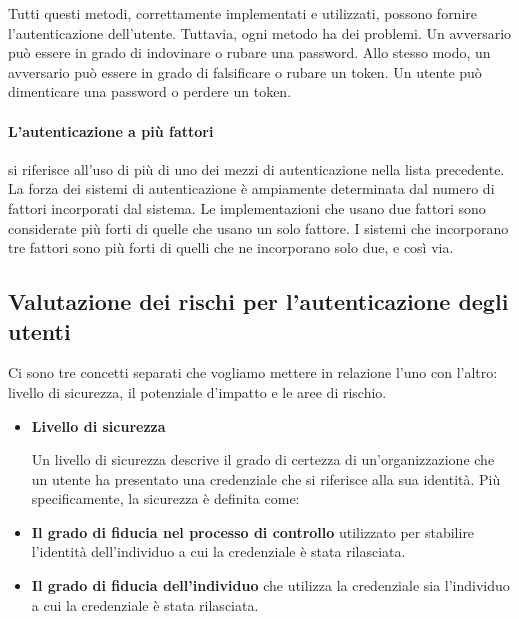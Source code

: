 Tutti questi metodi, correttamente implementati e utilizzati, possono fornire l'autenticazione dell'utente. Tuttavia, ogni metodo ha dei problemi. Un avversario può essere in grado di indovinare o rubare una password. Allo stesso modo, un avversario può essere in grado di falsificare o rubare un token. Un utente può dimenticare una password o perdere un token. 
\\
\paragraph{L'autenticazione a più fattori} si riferisce all'uso di più di uno dei mezzi di autenticazione nella lista precedente. La forza dei sistemi di autenticazione è ampiamente determinata dal numero di fattori incorporati dal sistema. Le implementazioni che usano due fattori sono considerate più forti di quelle che usano un solo fattore. I sistemi che incorporano tre fattori sono più forti di quelli che ne incorporano solo due, e così via.

\newpage
\subsection{Valutazione dei rischi per l'autenticazione degli utenti}
Ci sono tre concetti separati che vogliamo mettere in relazione l'uno con l'altro: livello di sicurezza, il potenziale d'impatto e le aree di rischio.

\begin{itemize}
    \item \textbf{Livello di sicurezza}

Un livello di sicurezza descrive il grado di certezza di un'organizzazione che un utente ha presentato una credenziale che si riferisce alla sua identità. Più specificamente, la sicurezza è definita come:

    \item \textbf{Il grado di fiducia nel processo di controllo} utilizzato per stabilire l'identità dell'individuo a cui la credenziale è stata rilasciata.
    
    \item \textbf{Il grado di fiducia dell'individuo} che utilizza la credenziale sia l'individuo a cui la credenziale è stata rilasciata.
\end{itemize}
